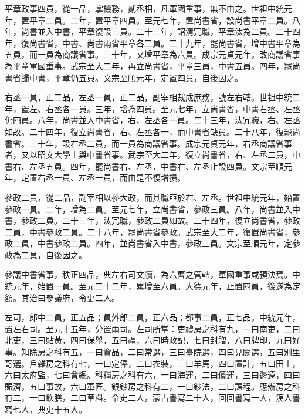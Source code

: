 \begin{pinyinscope}
 平章政事四員，從一品，掌機務，貳丞相，凡軍國重事，無不由之。世祖中統元年，置平章二員。二年，置平章四員。至元七年，置尚書省，設尚書平章二員。八年，尚書並入中書，平章復設三員。二十三年，詔清冗職，平章汰為二員。二十四年，復尚書省，中書、尚書兩省平章各二員。二十九年，罷尚書省，增中書平章為五員，而一員為商議省事。三十年，又增平章為六員。成宗元貞元年，改商議省事為平章軍國重事。武宗至大二年，再立尚書省，平章三員，中書五員。四年，罷尚書省歸中書，平章仍五員。文宗至順元年，定置四員，自後因之。



 右丞一員，正二品，左丞一員，正二品，副宰相裁成庶務，號左右轄。世祖中統二年，置左、右丞各一員。三年，增為四員。至元七年，立尚書省，中書右丞、左丞仍四員。八年，尚書並入中書省，右、左丞各一員。二十三年，汰冗職，右、左丞如故。二十四年，復立尚書省，右、左丞各一，而中書省缺員。二十八年，復罷尚書省。三十年，設右丞二員，而一員為商議省事。成宗元貞元年，右丞商議省事者，又以昭文大學士與中書省事。武宗至大二年，復立尚書省，右、左丞二員，中書右、左丞五員。四年，罷尚書右、左丞，中書右、左丞止設四員。文宗至順元年，定置右丞一員、左丞一員，而由是不復增損。



 參政二員，從二品，副宰相以參大政，而其職亞於右、左丞。世祖中統元年，始置參政一員。二年，增為二員。至元七年，立尚書省，參政三員。八年，尚書並入中書，參政二員。二十三年，汰冗職，參政二員如故。二十四年，復立尚書省，參政二員，中書參政二員。二十八年，罷尚書省參政。武宗至大二年，復置尚書省，參政二員，中書參政二員。四年，並尚書省入中書，參政三員。文宗至順元年，定參政為二員，自後因之。



 參議中書省事，秩正四品，典左右司文牘，為六曹之管轄，軍國重事咸預決焉。中統元年，始置一員。至元二十二年，累增至六員。大德元年，止置四員，後遂為定額。其治曰參議府，令史二人。



 左司，郎中二員，正五品；員外郎二員，正六品；都事二員，正七品。中統元年，置左右司。至元十五年，分置兩司。左司所掌：吏禮房之科有九，一曰南吏，二曰北吏，三曰貼黃，四曰保舉，五曰禮，六曰時政記，七曰封贈，八曰牌印，九曰好事。知除房之科有五，一曰資品，二曰常選，三曰臺院選，四曰見闕選，五曰別里哥選。戶雜房之科有七，一曰定俸，二曰衣裝，三曰羊馬，四曰置計，五曰田土，六曰太府監，七曰會總。科糧房之科有六，一曰海運，二曰儹運，三曰邊遠，四曰賑濟，五曰事故，六曰軍匠。銀鈔房之科有二，一曰鈔法，二曰課程。應辦房之科有二，一曰飲膳，二曰草料。令史二人，蒙古書寫二十人，回回書寫一人，漢人書寫七人，典吏十五人。




\end{pinyinscope}
